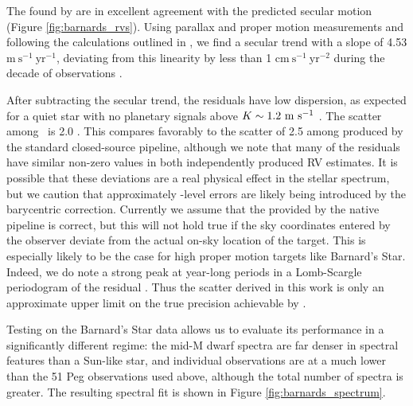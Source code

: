 \documentclass[modern]{aastex62}
\newcommand{\Mdwarf}{Barnard's Star\xspace} %
\begin{document}
{The \RVs found by \wobble are in excellent agreement with the predicted secular motion (Figure \ref{fig:barnards_rvs}). 
Using \gaia parallax and proper motion measurements and following the calculations outlined in \citet{Kurster2003}, we find a secular trend with a slope of 4.53 $\mathrm{m}~\mathrm{s}^{-1}~\mathrm{yr}^{-1}$, deviating from this linearity by less than 1 $\mathrm{cm}~\mathrm{s}^{-1}~\mathrm{yr}^{-2}$ during the decade of \HARPS observations \citep{gaia2016, gaia2018}. 

After subtracting the secular \RV trend, the residuals have low dispersion, as expected for a quiet star with no planetary signals above $K \sim 1.2~\mathrm{m}~\mathrm{s}^{-1}$ \citep{Choi2013, Ribas2018}. 
The  scatter among \wobble\ \RVs is 2.0 \ms. 
This compares favorably to the scatter of 2.5 \ms among \RVs produced by the standard closed-source \HARPS pipeline, although we note that many of the residuals have similar non-zero values in both independently produced RV estimates. 
It is possible that these deviations are a real physical effect in the stellar spectrum, but we caution that approximately \ms-level errors are likely being introduced by the barycentric correction. 
Currently we assume that the \BERV provided by the native \HARPS pipeline is correct, but this will not hold true if the sky coordinates entered by the observer deviate from the actual on-sky location of the target. 
This is especially likely to be the case for high proper motion targets like \Mdwarf. 
Indeed, we do note a strong peak at year-long periods in a Lomb-Scargle periodogram of the residual \RVs. 
Thus the \RV scatter derived in this work is only an approximate upper limit on the true precision achievable by \wobble.  

Testing \wobble on the \Mdwarf data allows us to evaluate its performance in a significantly different regime: the mid-M dwarf spectra are far denser in spectral features than a Sun-like star, and individual observations are at a much lower \SNR than the 51 Peg observations used above, although the total number of spectra is greater. 
The resulting spectral fit is shown in Figure \ref{fig:barnards_spectrum}.

}
\end{document}
